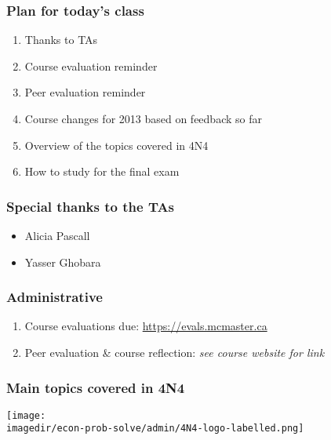 
\begin{frame}\frametitle{Plan for today's class}
	\begin{enumerate}
		\item	Thanks to TAs
		\item	Course evaluation reminder
		\item	Peer evaluation reminder
		\item	Course changes for 2013 based on feedback so far
		\item	Overview of the topics covered in 4N4
		\item	How to study for the final exam
	\end{enumerate}
\end{frame}

\begin{frame}\frametitle{Special thanks to the TAs}
	\begin{itemize}
		\item	Alicia Pascall
		\item	Yasser Ghobara
	\end{itemize}
\end{frame}

\begin{frame}\frametitle{Administrative}
	\begin{enumerate}
		\item	Course evaluations due: \href{https://evals.mcmaster.ca}{https://evals.mcmaster.ca}
		\item	Peer evaluation \& course reflection: \emph{see course website for link}
	\end{enumerate}
\end{frame}

\begin{frame}\frametitle{Main topics covered in 4N4}
	\begin{center}
		\texttt{[image: \\imagedir/econ-prob-solve/admin/4N4-logo-labelled.png]}
	\end{center}
	\vspace{-12pt}
	{\small {\color{brown}{This is a unique course: not taught anywhere else.}}}
\end{frame}

